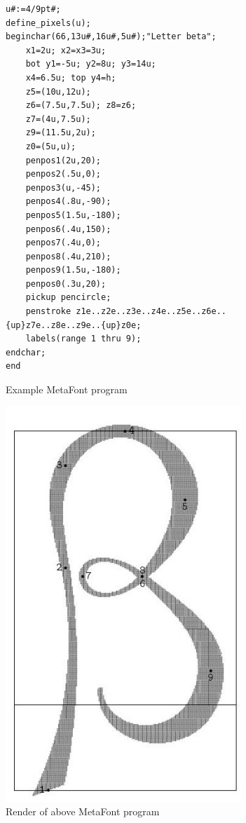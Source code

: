 \documentclass{article}
\begin{document}
\begin{figure}[htb!]
\begin{verbatim}
u#:=4/9pt#;
define_pixels(u);
beginchar(66,13u#,16u#,5u#);"Letter beta";
    x1=2u; x2=x3=3u;
    bot y1=-5u; y2=8u; y3=14u;
    x4=6.5u; top y4=h;
    z5=(10u,12u);
    z6=(7.5u,7.5u); z8=z6;
    z7=(4u,7.5u);
    z9=(11.5u,2u);
    z0=(5u,u);
    penpos1(2u,20);
    penpos2(.5u,0);
    penpos3(u,-45);
    penpos4(.8u,-90);
    penpos5(1.5u,-180);
    penpos6(.4u,150);
    penpos7(.4u,0);
    penpos8(.4u,210);
    penpos9(1.5u,-180);
    penpos0(.3u,20);
    pickup pencircle;
    penstroke z1e..z2e..z3e..z4e..z5e..z6e..{up}z7e..z8e..z9e..{up}z0e;
    labels(range 1 thru 9);
endchar;
end
\end{verbatim}
\caption{Example MetaFont program}
\label{fig:fontdesc}
\end{figure}

\begin{figure}[htb!]
\centering
\includegraphics[scale=0.20]{beta}
\caption{Render of above MetaFont program}
\label{fig:fontrender}
\end{figure}
\end{document}
